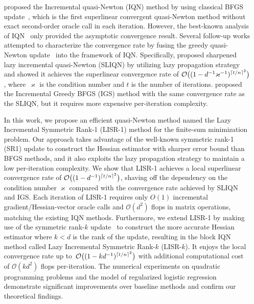 \documentclass[letterpaper]{article} %
\theoremstyle{plain}
\theoremstyle{definition}
\theoremstyle{remark}
\DeclarePairedDelimiter\ceil{\lceil}{\rceil}
\def\fO{{\mathcal{O}}}
\begin{document}
\citet{mokhtari2018iqn} proposed the Incremental quasi-Newton (IQN) method by using classical BFGS update~\cite{broyden1970convergence,fletcher1970new,goldfarb1970family,shanno1970conditioning}, which is the first superlinear convergent quasi-Newton method without exact second-order oracle call in each iteration.
However, the best-known analysis of IQN~\cite{mokhtari2018iqn} only provided the asymptotic convergence result. 
Several follow-up works \cite{gao2020incremental, lahoti2023sharpened} attempted to characterize the convergence rate by fusing the greedy quasi-Newton update~\cite{rodomanov2021greedy} into the framework of IQN.
Specifically, \citet{lahoti2023sharpened} proposed sharpened lazy incremental quasi-Newton (SLIQN) by utilizing lazy propagation strategy and showed it achieves the superlinear convergence rate of $\fO\big((1-d^{-1} \varkappa^{-1})^{\ceil{t/n}^2}\big)$, where~$\varkappa$ is the condition number and $t$ is the number of iterations. 
\citet{gao2020incremental} proposed the Incremental Greedy BFGS (IGS) method with the same convergence rate as the SLIQN, but it requires more expensive per-iteration complexity.

In this work, we propose an efficient quasi-Newton method named the Lazy Incremental Symmetric Rank-1 (LISR-1) method for the finite-sum minimization problem. 
Our approach takes advantage of the well-known symmetric rank-1 (SR1) update to construct the Hessian estimator with sharper error bound than BFGS methods, and it also exploits the lazy propagation strategy to maintain a low per-iteration complexity.  
We show that LISR-1 achieves a local superlinear convergence rate of $\fO\big((1-d^{-1})^{\ceil{t/n}^2}\big)$, 
shaving off the dependency on the condition number $\varkappa$ compared with the convergence rate achieved by SLIQN and IGS. %
Each iteration of LISR-1 requires only $O(1)$ incremental gradient/Hessian-vector oracle calls and $\fO(d^2)$ flops in matrix operations, matching the existing IQN methods. %
Furthermore, we extend LISR-1 by making use of the symmetric rank-$k$ update~\cite{liu2023symmetric}  to construct the more accurate Hessian estimator where $k<d$ is the rank of the update, resulting in the block IQN method called Lazy Incremental Symmetric Rank-$k$ (LISR-$k$).
It enjoys the local convergence rate up to~$\fO\big((1- k d^{-1})^{\ceil{t/n}^2}\big)$ with additional computational cost of $\fO(k d^2)$ flops per-iteration. 
The numerical experiments on quadratic programming problems and the model of regularized logistic regression demonstrate significant improvements over baseline methods and confirm our theoretical findings.
\end{document}
